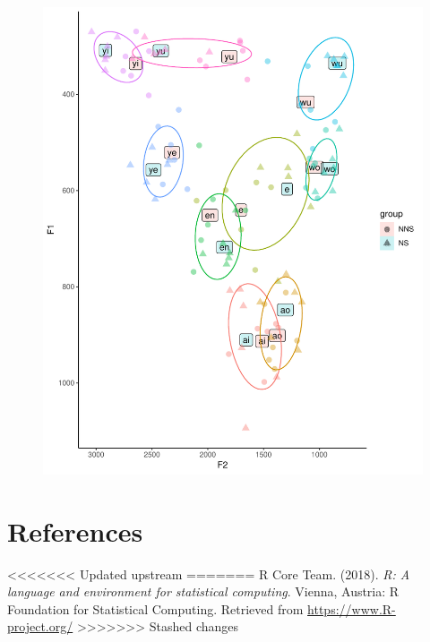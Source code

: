 \documentclass[man, fleqn, noextraspace]{apa6}
\begin{document}
\begin{figure}
\centering
\includegraphics{Vowel_v2_files/figure-latex/figure6-1.pdf}
\caption{}
\end{figure}

\newpage

\section{References}\label{references}

\begingroup
\setlength{\parindent}{-0.5in} \setlength{\leftskip}{0.5in}

\hypertarget{refs}{}
<<<<<<< Updated upstream
=======
\hypertarget{ref-R-base}{}
R Core Team. (2018). \emph{R: A language and environment for statistical
computing}. Vienna, Austria: R Foundation for Statistical Computing.
Retrieved from \url{https://www.R-project.org/}
>>>>>>> Stashed changes

\endgroup
\end{document}
